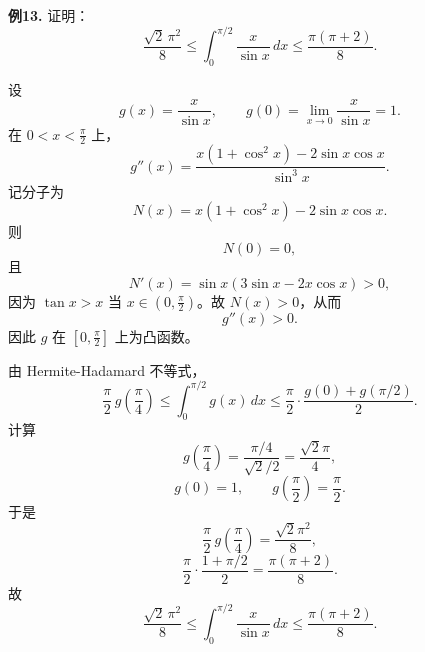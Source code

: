 \begin{problemblock}
\textbf{例13.} 证明：
\[
\frac{\sqrt2\,\pi^2}{8}
\le
\int_0^{\pi/2}\frac{x}{\sin x}\,dx
\le
\frac{\pi(\pi+2)}8.
\]
\end{problemblock}
\begin{solutionblock}
设
\[
g(x)=\frac{x}{\sin x},\qquad g(0)=\lim_{x\to0}\frac{x}{\sin x}=1.
\]
在 \(0<x<\frac\pi2\) 上，
\[
g''(x)=\frac{x(1+\cos^2x)-2\sin x\cos x}{\sin^3x}.
\]
记分子为
\[
N(x)=x(1+\cos^2x)-2\sin x\cos x.
\]
则
\[
N(0)=0,
\]
且
\[
N'(x)=\sin x(3\sin x-2x\cos x)>0,
\]
因为 \(\tan x>x\) 当 \(x\in(0,\frac\pi2)\)。故 \(N(x)>0\)，从而
\[
g''(x)>0.
\]
因此 \(g\) 在 \([0,\frac\pi2]\) 上为凸函数。

由 Hermite-Hadamard 不等式，
\[
\frac\pi2\,g\left(\frac\pi4\right)
\le
\int_0^{\pi/2}g(x)\,dx
\le
\frac\pi2\cdot\frac{g(0)+g(\pi/2)}2.
\]
计算
\[
g\left(\frac\pi4\right)=\frac{\pi/4}{\sqrt2/2}=\frac{\sqrt2\pi}{4},
\]
\[
g(0)=1,\qquad g\left(\frac\pi2\right)=\frac\pi2.
\]
于是
\[
\frac\pi2\,g\left(\frac\pi4\right)
=\frac{\sqrt2\pi^2}{8},
\]
\[
\frac\pi2\cdot\frac{1+\pi/2}{2}
=\frac{\pi(\pi+2)}8.
\]
故
\[
\frac{\sqrt2\,\pi^2}{8}
\le
\int_0^{\pi/2}\frac{x}{\sin x}\,dx
\le
\frac{\pi(\pi+2)}8.
\]
\end{solutionblock}
